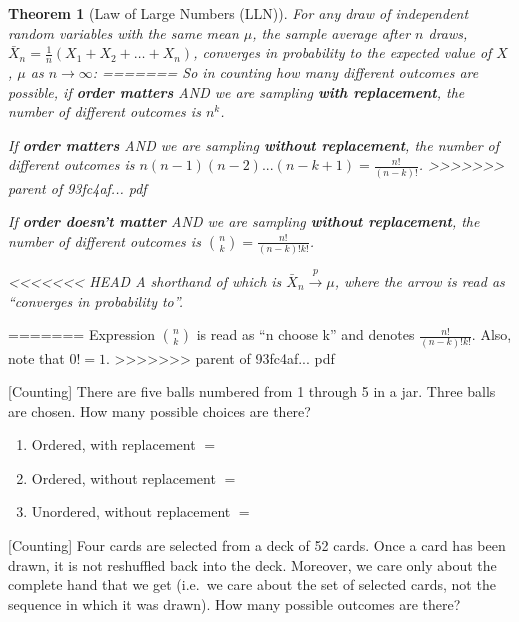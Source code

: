 \documentclass[]{book}
\newtheorem{theorem}{Theorem}[chapter]
\theoremstyle{definition}
\theoremstyle{definition}
\theoremstyle{definition}
\theoremstyle{remark}
\begin{document}
\begin{theorem}[Law of Large Numbers (LLN)]
\protect\hypertarget{thm:lln}{}{\label{thm:lln} {} }For any draw of independent random variables with the same mean \(\mu\), the sample average after \(n\) draws, \(\bar{X}_n = \frac{1}{n}(X_1 + X_2 + \ldots + X_n)\), converges in probability to the expected value of \(X\), \(\mu\) as \(n \rightarrow \infty\):
=======
So in counting how many different outcomes are possible, if \textbf{\emph{order matters}} AND we are sampling \textbf{\emph{with replacement}}, the number of different outcomes is \(n^k\).

If \textbf{\emph{order matters}} AND we are sampling \textbf{\emph{without replacement}}, the number of different outcomes is \(n(n-1)(n-2)...(n-k+1)=\frac{n!}{(n-k)!}\).
>>>>>>> parent of 93fc4af... pdf

If \textbf{\emph{order doesn't matter}} AND we are sampling \textbf{\emph{without replacement}}, the number of different outcomes is \(\binom{n}{k} = \frac{n!}{(n-k)!k!}\).

<<<<<<< HEAD
A shorthand of which is \(\bar{X}_n \xrightarrow{p} \mu\), where the arrow is read as ``converges in probability to''.
\end{theorem}
=======
Expression \(\binom{n}{k}\) is read as ``n choose k'' and denotes \(\frac{n!}{(n-k)!k!}\). Also, note that \(0! = 1\).
>>>>>>> parent of 93fc4af... pdf

[Counting]
\protect\hypertarget{exm:counting}{}{\label{exm:counting} {} }
There are five balls numbered from 1 through 5 in a jar. Three balls are chosen. How many possible choices are there?

\begin{enumerate}
\def\labelenumi{\arabic{enumi}.}
\item
  Ordered, with replacement \(=\)
\item
  Ordered, without replacement \(=\)
\item
  Unordered, without replacement \(=\)
\end{enumerate}

[Counting]
\protect\hypertarget{exr:counting1}{}{\label{exr:counting1} {} }
Four cards are selected from a deck of 52 cards. Once a card has been drawn, it is not reshuffled back into the deck. Moreover, we care only about the complete hand that we get (i.e.~we care about the set of selected cards, not the sequence in which it was drawn). How many possible outcomes are there?
\end{document}
